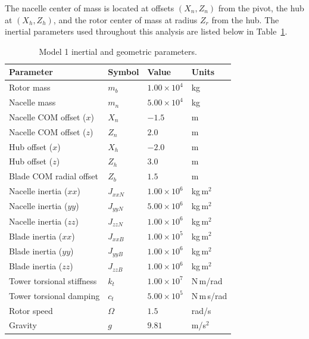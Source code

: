 \documentclass[final,onecolumn]{IEEEtran}
\begin{document}
The nacelle center of mass is located at offsets $(X_n, Z_n)$ from the pivot, the hub at $(X_h, Z_h)$, and the rotor center of mass at radius $Z_r$ from the hub. The inertial parameters used throughout this analysis are listed below in Table~\ref{tab:model1_params}.

\begin{table}[H]
    \centering
    \caption{Model 1 inertial and geometric parameters.}
    \label{tab:model1_params}
    \begin{tabular}{llll}
        \hline
        Parameter                 & Symbol    & Value              & Units       \\
        \hline
        Rotor mass                & $m_b$     & $1.00 \times 10^4$ & kg          \\
        Nacelle mass              & $m_n$     & $5.00 \times 10^4$ & kg          \\
        Nacelle COM offset ($x$)  & $X_n$     & $-1.5$             & m           \\
        Nacelle COM offset ($z$)  & $Z_n$     & $2.0$              & m           \\
        Hub offset ($x$)          & $X_h$     & $-2.0$             & m           \\
        Hub offset ($z$)          & $Z_h$     & $3.0$              & m           \\
        Blade COM radial offset   & $Z_b$     & $1.5$              & m           \\
        Nacelle inertia ($xx$)    & $J_{xxN}$ & $1.00 \times 10^6$ & kg\,m$^2$   \\
        Nacelle inertia ($yy$)    & $J_{yyN}$ & $5.00 \times 10^6$ & kg\,m$^2$   \\
        Nacelle inertia ($zz$)    & $J_{zzN}$ & $1.00 \times 10^6$ & kg\,m$^2$   \\
        Blade inertia ($xx$)      & $J_{xxB}$ & $1.00 \times 10^5$ & kg\,m$^2$   \\
        Blade inertia ($yy$)      & $J_{yyB}$ & $1.00 \times 10^6$ & kg\,m$^2$   \\
        Blade inertia ($zz$)      & $J_{zzB}$ & $1.00 \times 10^6$ & kg\,m$^2$   \\
        Tower torsional stiffness & $k_t$     & $1.00 \times 10^7$ & N\,m/rad    \\
        Tower torsional damping   & $c_t$     & $5.00 \times 10^5$ & N\,m\,s/rad \\
        Rotor speed               & $\Omega$  & $1.5$              & rad/s       \\
        Gravity                   & $g$       & $9.81$             & m/s$^2$     \\
        \hline
    \end{tabular}
\end{table}
\end{document}
